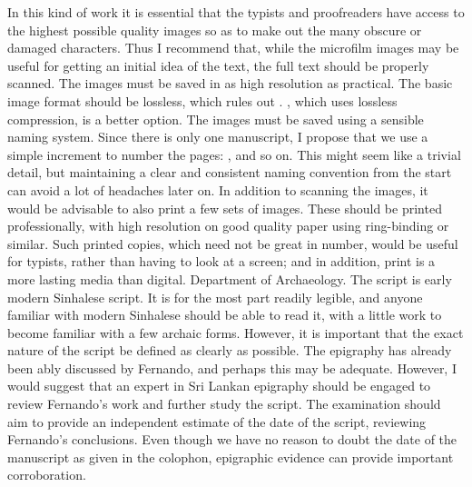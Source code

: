 {}\markdownRendererInterblockSeparator
{}In this kind of work it is essential that the typists and proofreaders have access to the highest possible quality images so as to make out the many obscure or damaged characters. Thus I recommend that, while the microfilm images may be useful for getting an initial idea of the text, the full text should be properly scanned.\markdownRendererInterblockSeparator
{}The images must be saved in as high resolution as practical. The basic image format should be lossless, which rules out . , which uses lossless compression, is a better option.\markdownRendererInterblockSeparator
{}The images must be saved using a sensible naming system. Since there is only one manuscript, I propose that we use a simple increment to number the pages: ,  and so on. This might seem like a trivial detail, but maintaining a clear and consistent naming convention from the start can avoid a lot of headaches later on.\markdownRendererInterblockSeparator
{}In addition to scanning the images, it would be advisable to also print a few sets of images. These should be printed professionally, with high resolution on good quality paper using ring-binding or similar. Such printed copies, which need not be great in number, would be useful for typists, rather than having to look at a screen; and in addition, print is a more lasting media than digital.\markdownRendererInterblockSeparator
{}\markdownRendererBlockQuoteBegin
{} Department of Archaeology.
\markdownRendererBlockQuoteEnd \markdownRendererInterblockSeparator
{}\markdownRendererInterblockSeparator
{}The script is early modern Sinhalese script. It is for the most part readily legible, and anyone familiar with modern Sinhalese should be able to read it, with a little work to become familiar with a few archaic forms. However, it is important that the exact nature of the script be defined as clearly as possible.\markdownRendererInterblockSeparator
{}The epigraphy has already been ably discussed by Fernando, and perhaps this may be adequate. However, I would suggest that an expert in Sri Lankan epigraphy should be engaged to review Fernando’s work and further study the script.\markdownRendererInterblockSeparator
{}The examination should aim to provide an independent estimate of the date of the script, reviewing Fernando’s conclusions. Even though we have no reason to doubt the date of the manuscript as given in the colophon, epigraphic evidence can provide important corroboration.\markdownRendererInterblockSeparator
